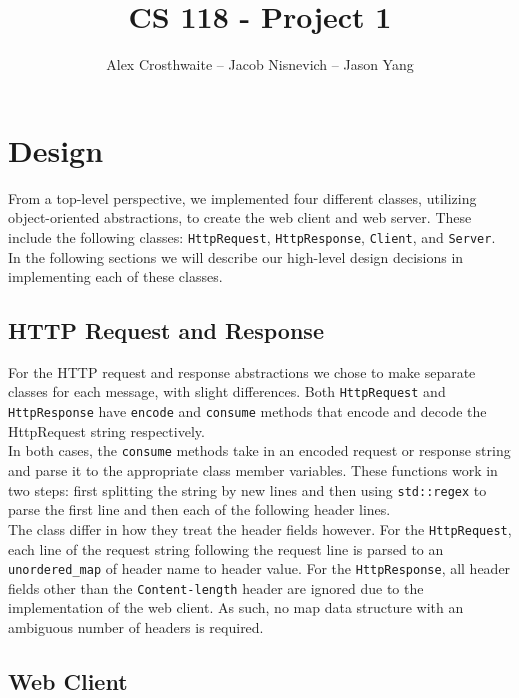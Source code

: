 \documentclass{article}
\begin{document}
\title{CS 118 - Project 1}
\author{Alex Crosthwaite -- Jacob Nisnevich -- Jason Yang}

\maketitle

\section{Design}

From a top-level perspective, we implemented four different classes, utilizing object-oriented abstractions, to create the web client and web server. These include the following classes: \texttt{HttpRequest}, \texttt{HttpResponse}, \texttt{Client}, and \texttt{Server}. In the following sections we will describe our high-level design decisions in implementing each of these classes.

\subsection{HTTP Request and Response}

For the HTTP request and response abstractions we chose to make separate classes for each message, with slight differences. Both \texttt{HttpRequest} and \texttt{HttpResponse} have \texttt{encode} and \texttt{consume} methods that encode and decode the HttpRequest string respectively. \\

\noindent
In both cases, the \texttt{consume} methods take in an encoded request or response string and parse it to the appropriate class member variables. These functions work in two steps: first splitting the string by new lines and then using \texttt{std::regex} to parse the first line and then each of the following header lines. \\

\noindent
The class differ in how they treat the header fields however. For the \texttt{HttpRequest}, each line of the request string following the request line is parsed to an \texttt{unordered\_map} of header name to header value. For the \texttt{HttpResponse}, all header fields other than the \texttt{Content-length} header are ignored due to the implementation of the web client. As such, no map data structure with an ambiguous number of headers is required.

\subsection{Web Client}
\end{document}
